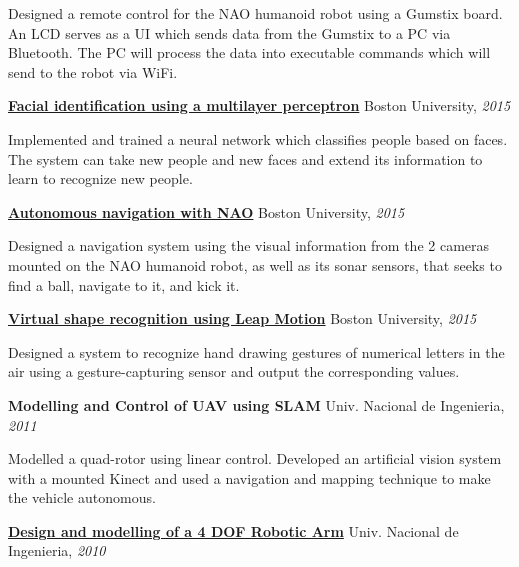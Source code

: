 \documentclass[letterpaper,MMMyyyy,nonstop]{simpleresumecv}
\begin{document}
\begin{body}
\GapNoBreak
\BulletItem
Designed a remote control for the NAO humanoid robot using a Gumstix board. An LCD serves as a UI which sends data from the Gumstix to a PC via Bluetooth. The PC will process the data into executable commands which will send to the robot via WiFi.
\GapNoBreak

\href{https://docs.google.com/presentation/d/1328Qvm9VlAZadwlNoU3n5m1REY36m_hGcakSYlxW2vM/edit?ts=565d2938#slide=id.p}
{\textbf{Facial identification using a multilayer perceptron}}
\hfill
Boston University, \textit{2015}

\GapNoBreak
\BulletItem
Implemented and trained a neural network which classifies people based on faces. The system can take new people and new faces and extend its information to learn to recognize new people.
\GapNoBreak

\href{http://www.bu.edu/vip/files/pubs/reports/DLTM15-06buece.pdf}
{\textbf{Autonomous navigation with NAO}}
\hfill
Boston University, \textit{2015}

\GapNoBreak
\BulletItem
Designed a navigation system using the visual information from the 2 cameras mounted on the NAO humanoid robot, as well as its sonar sensors, that seeks to find a ball, navigate to it, and kick it.
\GapNoBreak

\BigGap
\href{http://www.bu.edu/vip/files/pubs/reports/DLDP15-03buece.pdf}
{\textbf{Virtual shape recognition using Leap Motion}}
\hfill
Boston University, \textit{2015}

\GapNoBreak
\BulletItem
Designed a system to recognize hand drawing gestures of numerical letters in the air using a gesture-capturing sensor and  output the corresponding values.
\GapNoBreak

\BigGap
\textbf{Modelling and Control of UAV using SLAM}
\hfill
Univ. Nacional de Ingenieria, \textit{2011}

\GapNoBreak
\BulletItem
Modelled a quad-rotor using linear control. Developed an artificial vision system with a mounted Kinect and used a navigation and mapping technique to make the vehicle autonomous.
\GapNoBreak

\BigGap
\href{https://github.com/davidlavy88/resume/blob/master/Paper/paper-mt-517.pdf}
{\textbf{Design and modelling of a 4 DOF Robotic Arm}}
\hfill
Univ. Nacional de Ingenieria, \textit{2010}


\end{body}
\end{document}
